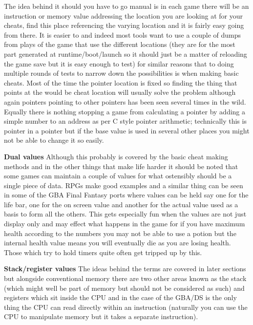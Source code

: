 \documentclass[
]{book}
\begin{document}
The idea behind it should you have to go manual is in each game there will be an instruction or memory value addressing the location you are looking at for your cheats, find this place referencing the varying location and it is fairly easy going from there. It is easier to and indeed most tools want to use a couple of dumps from plays of the game that use the different locations (they are for the most part generated at runtime/boot/launch so it should just be a matter of reloading the game save but it is easy enough to test) for similar reasons that to doing multiple rounds of tests to narrow down the possibilities is when making basic cheats. Most of the time the pointer location is fixed so finding the thing that points at the would be cheat location will usually solve the problem although again pointers pointing to other pointers has been seen several times in the wild. Equally there is nothing stopping a game from calculating a pointer by adding a simple number to an address as per C style pointer arithmetic; technically this is pointer in a pointer but if the base value is used in several other places you might not be able to change it so easily.

\textbf{Dual values} Although this probably is covered by the basic cheat making methods and in the other things that make life harder it should be noted that some games can maintain a couple of values for what ostensibly should be a single piece of data. RPGs make good examples and a similar thing can be seen in some of the GBA Final Fantasy ports where values can be held say one for the life bar, one for the on screen value and another for the actual value used as a basis to form all the others. This gets especially fun when the values are not just display only and may effect what happens in the game for if you have maximum health according to the numbers you may not be able to use a potion but the internal health value means you will eventually die as you are losing health. Those which try to hold timers quite often get tripped up by this.

\textbf{Stack/register values} The ideas behind the terms are covered in later sections but alongside conventional memory there are two other areas known as the stack (which might well be part of memory but should not be considered as such) and registers which sit inside the CPU and in the case of the GBA/DS is the only thing the CPU can read directly within an instruction (naturally you can use the CPU to manipulate memory but it takes a separate instruction).
\end{document}
